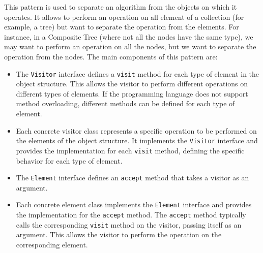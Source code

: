 This pattern is used to separate an algorithm from the objects on which it operates. It allows to perform an operation on all element of a collection (for example, a tree) but want to separate the operation from the elements. For instance, in a Composite Tree (where not all the nodes have the same type), we may want to perform an operation on all the nodes, but we want to separate the operation from the nodes.
The main components of this pattern are:
\begin{itemize}
    \item The \texttt{Visitor} interface defines a \texttt{visit} method for each type of element in the object structure. This allows the visitor to perform different operations on different types of elements. If the programming language does not support method overloading, different methods can be defined for each type of element.
    \item Each concrete visitor class represents a specific operation to be performed on the elements of the object structure. It implements the \texttt{Visitor} interface and provides the implementation for each \texttt{visit} method, defining the specific behavior for each type of element.
    \item The \texttt{Element} interface defines an \texttt{accept} method that takes a visitor as an argument. 
    \item Each concrete element class implements the \texttt{Element} interface and provides the implementation for the \texttt{accept} method. The \texttt{accept} method typically calls the corresponding \texttt{visit} method on the visitor, passing itself as an argument. This allows the visitor to perform the operation on the corresponding element.
\end{itemize}

